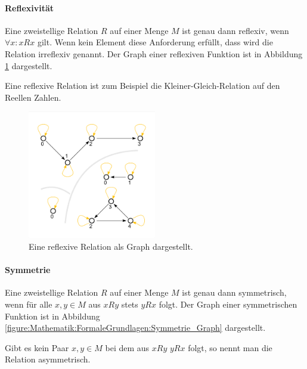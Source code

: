 \documentclass[../main.tex]{subfiles}
\begin{document}
                \paragraph{Reflexivität}
                    Eine zweistellige Relation $R$ auf einer Menge $M$ ist genau dann reflexiv, wenn $\forall x\colon xRx$ gilt. Wenn kein Element diese Anforderung erfüllt, dass wird die Relation irreflexiv genannt. Der Graph einer reflexiven Funktion ist in Abbildung \ref{figure:Mathematik:FormaleGrundlagen:Reflexivitaet_Graph} dargestellt.
                    
                    Eine reflexive Relation ist zum Beispiel die Kleiner-Gleich-Relation auf den Reellen Zahlen.
                    
                    \begin{figure}
                         \centering
                         \includegraphics[width=0.5\textwidth]{Abbildungen/Reflexivitaet_Graph.png}
                         \caption{Eine reflexive Relation als Graph dargestellt.}
                         \label{figure:Mathematik:FormaleGrundlagen:Reflexivitaet_Graph}
                    \end{figure}
                    
                \paragraph{Symmetrie}
                    Eine zweistellige Relation $R$ auf einer Menge $M$ ist genau dann symmetrisch, wenn für alle $x, y \in M$ aus $xRy$ stets $yRx$ folgt. Der Graph einer symmetrischen Funktion ist in Abbildung \ref{figure:Mathematik:FormaleGrundlagen:Symmetrie_Graph} dargestellt.
                    
                    Gibt es kein Paar $x, y \in M$ bei dem aus $xRy$ $yRx$ folgt, so nennt man die Relation asymmetrisch.
                    
\end{document}
